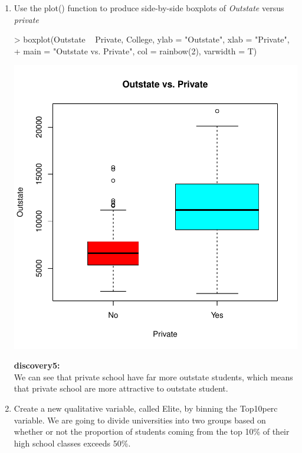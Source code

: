 \documentclass[a4paper]{article}
\begin{document}
\begin{enumerate}
\item Use the plot() function to produce side-by-side boxplots of \textit{Outstate} versus \textit{private}
\begin{Schunk}
\begin{Sinput}
> boxplot(Outstate ~ Private, College, ylab = "Outstate", xlab = "Private",
+         main = "Outstate vs. Private", col = rainbow(2), varwidth = T)
\end{Sinput}
\end{Schunk}
\includegraphics{introduction-outstate-private}

{
\colorbox{BurntOrange}{\textbf{discovery5:}}\color{red}\\
We can see that private school have far more outstate students, which means that private school are more attractive to outstate student.
}

\item Create a new qualitative variable, called Elite, by binning the Top10perc variable. We are going to divide universities into two groups based on whether or not the proportion of students coming from the top 10\% of their high school classes exceeds 50\%.


\end{enumerate}
\end{document}
